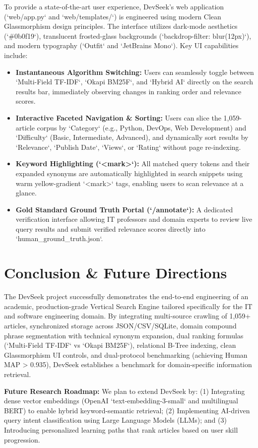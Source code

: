 \documentclass[12pt,a4paper]{article}
\begin{document}
To provide a state-of-the-art user experience, DevSeek's web application (`web/app.py` and `web/templates/`) is engineered using modern Clean Glassmorphism design principles. The interface utilizes dark-mode aesthetics (`\#0b0f19`), translucent frosted-glass backgrounds (`backdrop-filter: blur(12px)`), and modern typography (`Outfit` and `JetBrains Mono`). Key UI capabilities include:
\begin{itemize}
    \item \textbf{Instantaneous Algorithm Switching:} Users can seamlessly toggle between `Multi-Field TF-IDF`, `Okapi BM25F`, and `Hybrid AI` directly on the search results bar, immediately observing changes in ranking order and relevance scores.
    \item \textbf{Interactive Faceted Navigation \& Sorting:} Users can slice the 1,059-article corpus by `Category` (e.g., Python, DevOps, Web Development) and `Difficulty` (Basic, Intermediate, Advanced), and dynamically sort results by `Relevance`, `Publish Date`, `Views`, or `Rating` without page re-indexing.
    \item \textbf{Keyword Highlighting (`<mark>`):} All matched query tokens and their expanded synonyms are automatically highlighted in search snippets using warm yellow-gradient `<mark>` tags, enabling users to scan relevance at a glance.
    \item \textbf{Gold Standard Ground Truth Portal (`/annotate`):} A dedicated verification interface allowing IT professors and domain experts to review live query results and submit verified relevance scores directly into `human\_ground\_truth.json`.
\end{itemize}

\section{Conclusion \& Future Directions}

The DevSeek project successfully demonstrates the end-to-end engineering of an academic, production-grade Vertical Search Engine tailored specifically for the IT and software engineering domain. By integrating multi-source crawling of 1,059+ articles, synchronized storage across JSON/CSV/SQLite, domain compound phrase segmentation with technical synonym expansion, dual ranking formulas (`Multi-Field TF-IDF` vs `Okapi BM25F`), relational B-Tree indexing, clean Glassmorphism UI controls, and dual-protocol benchmarking (achieving Human MAP > 0.935), DevSeek establishes a benchmark for domain-specific information retrieval.

\textbf{Future Research Roadmap:} We plan to extend DevSeek by: (1) Integrating dense vector embeddings (OpenAI `text-embedding-3-small` and multilingual BERT) to enable hybrid keyword-semantic retrieval; (2) Implementing AI-driven query intent classification using Large Language Models (LLMs); and (3) Introducing personalized learning paths that rank articles based on user skill progression.
\end{document}

